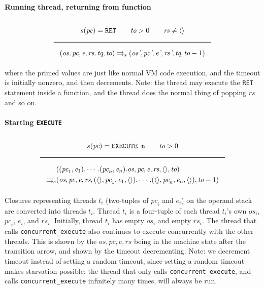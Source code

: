 \paragraph{Running thread, returning from function}
\label{sec:org09fb933}
$$\Rule{s(\textit{pc}) = \texttt{RET} \qquad \textit{to} > 0 \qquad \textit{rs} \neq \langle \rangle}{(\textit{os}, \textit{pc}, \textit{e}, \textit{rs}, \textit{tq}, \textit{to}) \transition (\textit{os'}, \textit{pc'}, \textit{e'}, \textit{rs'}, \textit{tq}, \textit{to}-1)}$$
where the primed values are just like normal VM code execution, and the timeout is initially nonzero, and then decrements. Note: the thread may execute the \texttt{RET} statement inside a function, and the thread does the normal thing of popping \(\textit{rs}\) and so on.

\paragraph{Starting \texttt{EXECUTE}}
\label{sec:orgd950fad}
$$\Rule{s(\textit{pc}) = \texttt{EXECUTE n} \qquad \textit{to} > 0}{
\begin{aligned}
&((\textit{pc}_1, \textit{e}_1). \cdots .(\textit{pc}_n, \textit{e}_n).\textit{os}, \textit{pc}, \textit{e}, \textit{rs}, \langle \rangle, \textit{to})\\
\transition &(\textit{os}, \textit{pc}, \textit{e}, \textit{rs}, (\langle \rangle, \textit{pc}_1, \textit{e}_1, \langle \rangle). \cdots .(\langle \rangle, \textit{pc}_n, \textit{e}_n, \langle \rangle), \textit{to}-1)
\end{aligned}}$$
Closures representing threads \(t_i\) (two-tuples of \(\textit{pc}_i\) and \(\textit{e}_i\)) on the operand stack are converted into threads \(t_i\). Thread \(t_i\) is a four-tuple of each thread \(t_i\)'s own \(\textit{os}_i\), \(\textit{pc}_i\), \(\textit{e}_i\), and \(\textit{rs}_i\). Initially, thread \(t_i\) has empty \(\textit{os}_i\) and empty \(\textit{rs}_i\).
The thread that calls \texttt{concurrent\_execute} also continues to execute concurrently with the other threads. This is shown by the \(\textit{os}, \textit{pc}, \textit{e}, \textit{rs}\) being in the machine state after the transition arrow, and shown by the timeout decrementing.
Note: we decrement timeout instead of setting a random timeout, since setting a random timeout makes starvation possible: the thread that only calls \texttt{concurrent\_execute}, and calls \texttt{concurrent\_execute} infinitely many times, will always be run.

